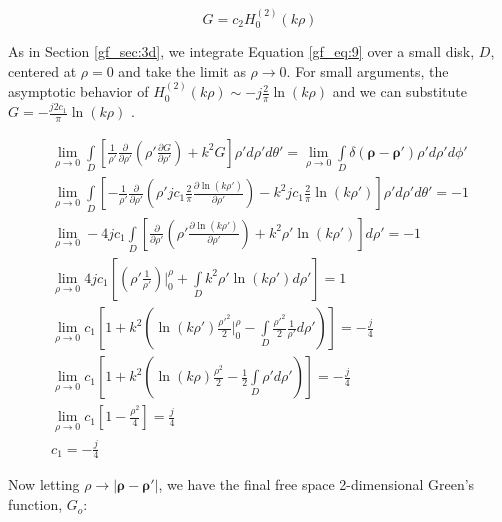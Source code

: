 \begin{equation}
G = c_2H_0^{(2)}\left(k\rho\right) 
\label{gf_eq:38}
\end{equation}
\renewcommand{\baselinestretch}{2} \small\normalsize

As in Section \ref{gf_sec:3d}, we integrate Equation \ref{gf_eq:9} over a small disk, $D$, centered at $\rho = 0$ and take the limit as $\rho \rightarrow 0$. For small arguments, the asymptotic behavior of $H_0^{(2)}(k\rho) \sim -j\frac{2}{\pi}\ln\left({k\rho}\right)$ and we can substitute $G = -\frac{j2c_1}{\pi}\ln\left({k\rho}\right)$ \cite{abramowitz_stegun}. 

\begin{equation}
\begin{gathered}
\lim_{\rho\to 0}\int\limits_{D} \left[ \frac{1}{\rho'}\frac{\partial}{\partial \rho'}\left(\rho' \frac{\partial G}{\partial \rho'} \right) + k^2G\right]\rho' d\rho' d\theta' = \lim_{\rho\to 0}\int\limits_{D} \delta\left(\boldsymbol{\rho}-\boldsymbol{\rho}' \right)\rho' d\rho' d\phi' \\
\lim_{\rho\to 0}\int\limits_{D} \left[ -\frac{1}{\rho'}\frac{\partial}{\partial \rho'}\left(\rho' jc_1\frac{2}{\pi}\frac{\partial \ln(k\rho')}{\partial \rho'} \right) - k^2jc_1\frac{2}{\pi}\ln(k\rho')\right]\rho' d\rho' d\theta' = -1 \\
\lim_{\rho\to 0}-4jc_1\int\limits_{D} \left[\frac{\partial}{\partial \rho'}\left(\rho' \frac{\partial \ln(k\rho')}{\partial \rho'} \right) + k^2\rho'\ln(k\rho')\right] d\rho' = -1 \\
\lim_{\rho\to 0}4jc_1\left[\left(\rho' \frac{1 }{\rho'} \right)\bigg|_0^{\rho} + \int\limits_{D}k^2\rho'\ln(k\rho') d\rho'\right] = 1 \\
\lim_{\rho\to 0}c_1\left[ 1 +  k^2\left( \ln(k\rho')\frac{\rho'^2}{2}\bigg|_0^{\rho} - \int\limits_{D}\frac{\rho'^2}{2}\frac{1}{\rho'} d\rho' \right)\right] = -\frac{j}{4} \\
\lim_{\rho\to 0}c_1\left[ 1 +  k^2\left( \ln(k\rho)\frac{\rho^2}{2} - \frac{1}{2}\int\limits_{D}\rho' d\rho' \right)\right] = -\frac{j}{4} \\
\lim_{\rho\to 0}c_1\left[ 1 - \frac{\rho^2}{4}\right] = \frac{j}{4} \\
c_1 = -\frac{j}{4}
\end{gathered}
\label{gf_eq:39}
\end{equation}
\renewcommand{\baselinestretch}{2} \small\normalsize

Now letting $\rho \rightarrow |\boldsymbol{\rho}-\boldsymbol{\rho}'|$, we have the final free space 2-dimensional Green's function, $G_o$:

